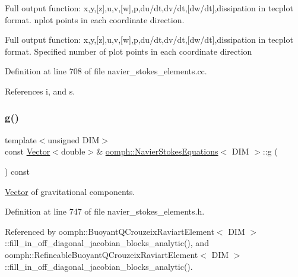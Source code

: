 Full output function\+: x,y,\mbox{[}z\mbox{]},u,v,\mbox{[}w\mbox{]},p,du/dt,dv/dt,\mbox{[}dw/dt\mbox{]},dissipation in tecplot format. nplot points in each coordinate direction. 

Full output function\+: x,y,\mbox{[}z\mbox{]},u,v,\mbox{[}w\mbox{]},p,du/dt,dv/dt,\mbox{[}dw/dt\mbox{]},dissipation in tecplot format. Specified number of plot points in each coordinate direction 

Definition at line 708 of file navier\+\_\+stokes\+\_\+elements.\+cc.



References i, and s.

\mbox{\label{classoomph_1_1NavierStokesEquations_aefe9f833c45ff77f6e73b33cbb68b6ee}} 
\subsubsection{\texorpdfstring{g()}{g()}}
{\footnotesize\ttfamily template$<$unsigned D\+IM$>$ \\
const \hyperlink{classoomph_1_1Vector}{Vector}$<$double$>$\& \hyperlink{classoomph_1_1NavierStokesEquations}{oomph\+::\+Navier\+Stokes\+Equations}$<$ D\+IM $>$\+::g (\begin{DoxyParamCaption}{ }\end{DoxyParamCaption}) const\hspace{0.3cm}{\ttfamily [inline]}}



\hyperlink{classoomph_1_1Vector}{Vector} of gravitational components. 



Definition at line 747 of file navier\+\_\+stokes\+\_\+elements.\+h.



Referenced by oomph\+::\+Buoyant\+Q\+Crouzeix\+Raviart\+Element$<$ D\+I\+M $>$\+::fill\+\_\+in\+\_\+off\+\_\+diagonal\+\_\+jacobian\+\_\+blocks\+\_\+analytic(), and oomph\+::\+Refineable\+Buoyant\+Q\+Crouzeix\+Raviart\+Element$<$ D\+I\+M $>$\+::fill\+\_\+in\+\_\+off\+\_\+diagonal\+\_\+jacobian\+\_\+blocks\+\_\+analytic().

\mbox{\label{classoomph_1_1NavierStokesEquations_aba22e0202e4252d8a2970e896aed0ef2}} 
